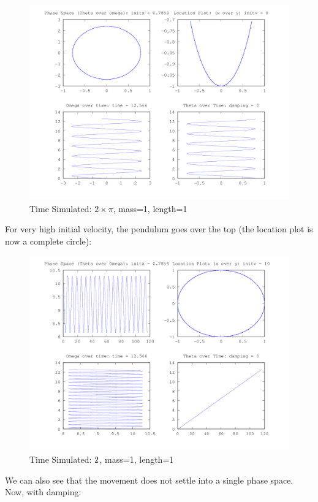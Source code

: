 \documentclass{article}
\begin{document}
\begin{figure}[H]
\caption{Time Simulated: $2\times\pi$, mass=1, length=1}
\includegraphics[width=\textwidth]{plot1}
\end{figure}

For very high initial velocity, the pendulum goes over the top (the location plot is now a complete circle): 
\begin{figure}[H]
\caption{Time Simulated: $2\time\pi$, mass=1, length=1}
\includegraphics[width=\textwidth]{plot2}
\end{figure}

We can also see that the movement does not settle into a single phase space. Now, with damping:
\end{document}
